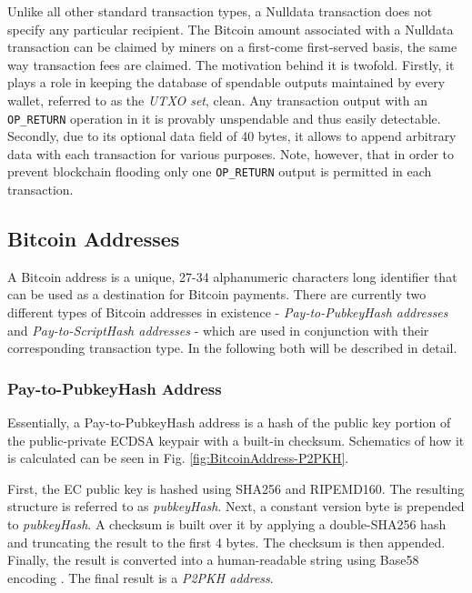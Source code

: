 \noindent
Unlike all other standard transaction types, a Nulldata transaction does not specify any particular recipient. The Bitcoin amount associated with a Nulldata transaction can be claimed by miners on a first-come first-served basis, the same way transaction fees are claimed. The motivation behind it is twofold. Firstly, it plays a role in keeping the database of spendable outputs maintained by every wallet, referred to as the \emph{UTXO set}, clean. Any transaction output with an \texttt{OP\_RETURN} operation in it is provably unspendable and thus easily detectable. Secondly, due to its optional data field of 40 bytes, it allows to append arbitrary data with each transaction for various purposes. Note, however, that in order to prevent blockchain flooding only one \texttt{OP\_RETURN} output is permitted in each transaction.

\clearpage
\subsection{Bitcoin Addresses} \label{sec:BitcoinAddresses}
A Bitcoin address is a unique, 27-34 alphanumeric characters long identifier that can be used as a destination for Bitcoin payments. There are currently two different types of Bitcoin addresses in existence - \emph{Pay-to-PubkeyHash addresses} and \emph{Pay-to-ScriptHash addresses} - which are used in conjunction with their corresponding transaction type. In the following both will be described in detail.

\subsubsection{Pay-to-PubkeyHash Address} \label{sec:Address-P2PKH}
Essentially, a Pay-to-PubkeyHash address is a hash of the public key portion of the public-private ECDSA keypair with a built-in checksum. Schematics of how it is calculated can be seen in Fig. \ref{fig:BitcoinAddress-P2PKH}.

First, the EC public key is hashed using SHA256 and RIPEMD160. The resulting structure is referred to as \textit{pubkeyHash}. Next, a constant version byte is prepended to \textit{pubkeyHash}. A checksum is built over it by applying a double-SHA256 hash and truncating the result to the first 4 bytes. The checksum is then appended. Finally, the result is converted into a human-readable string using Base58 encoding \cite{Base58}. The final result is a \emph{P2PKH address}.

